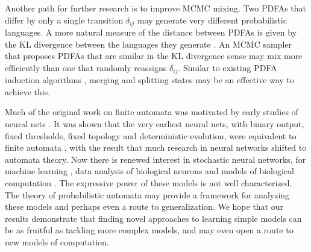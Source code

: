 Another path for further research is to improve MCMC mixing.  Two PDFAs that differ by only a single transition $\delta_{ij}$ may generate very different probabilistic languages.  A more natural measure of the distance between PDFAs is given by the KL divergence between the languages they generate \cite{Carrasco1994}.  An MCMC sampler that proposes PDFAs that are similar in the KL divergence sense may mix more efficiently than one that randomly reassigns $\delta_{ij}$.  Similar to existing PDFA induction algorithms \cite{Shalizi2004,Thollard2000}, merging and splitting states may be an effective way to achieve this.

Much of the original work on finite automata was motivated by early studies of neural nets \cite{Hopcroft1979}.  It was shown that the very earliest neural nets, with binary output, fixed thresholds, fixed topology and deterministic evolution, were equivalent to finite automata \cite{Kleene1956}, with the result that much research in neural networks shifted to automata theory.  Now there is renewed interest in stochastic neural networks, for machine learning \cite{Hinton2006}, data analysis of biological neurons \cite{Pillow2008} and models of biological computation \cite{Pouget? Lengyel? Fiser?}.  The expressive power of these models is not well characterized.  The theory of probabilistic automata may provide a framework for analyzing these models and perhaps even a route to generalization.  We hope that our results demonstrate that finding novel approaches to learning simple models can be as fruitful as tackling more complex models, and may even open a route to new models of computation.
